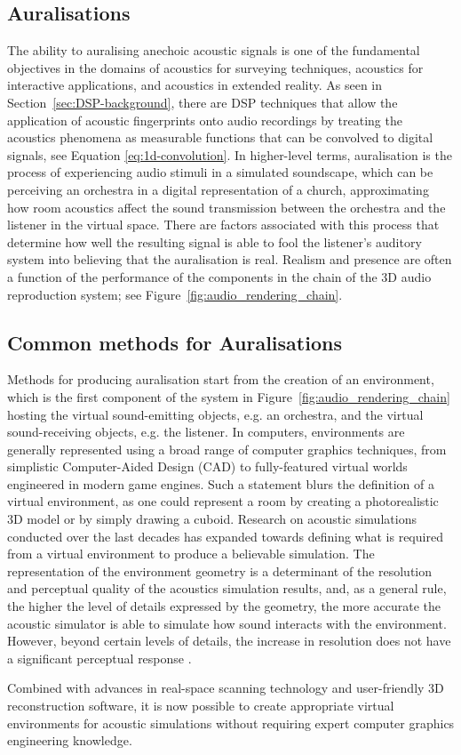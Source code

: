 \subsection{Auralisations}
The ability to auralising anechoic acoustic signals is one of the fundamental objectives in the domains of acoustics for surveying techniques, acoustics for interactive applications, and acoustics in extended reality. As seen in Section~\ref{sec:DSP-background}, there are DSP techniques that allow the application of acoustic fingerprints onto audio recordings by treating the acoustics phenomena as measurable functions that can be convolved to digital signals, see Equation \ref{eq:1d-convolution}. In higher-level terms, auralisation is the process of experiencing audio stimuli in a simulated soundscape, which can be perceiving an orchestra in a digital representation of a church, approximating how room acoustics affect the sound transmission between the orchestra and the listener in the virtual space. There are factors associated with this process that determine how well the resulting signal is able to fool the listener's auditory system into believing that the auralisation is real. Realism and presence are often a function of the performance of the components in the chain of the 3D audio reproduction system; see Figure~\ref{fig:audio_rendering_chain}.

\subsection{Common methods for Auralisations}
Methods for producing auralisation start from the creation of an environment, which is the first component of the system in Figure~\ref{fig:audio_rendering_chain} hosting the virtual sound-emitting objects, e.g. an orchestra, and the virtual sound-receiving objects, e.g. the listener. In computers, environments are generally represented using a broad range of computer graphics techniques, from simplistic Computer-Aided Design (CAD) to fully-featured virtual worlds engineered in modern game engines. Such a statement blurs the definition of a virtual environment, as one could represent a room by creating a photorealistic 3D model or by simply drawing a cuboid. Research on acoustic simulations conducted over the last decades has expanded towards defining what is required from a virtual environment to produce a believable simulation. The representation of the environment geometry is a determinant of the resolution and perceptual quality of the acoustics simulation results, and, as a general rule, the higher the level of details expressed by the geometry, the more accurate the acoustic simulator is able to simulate how sound interacts with the environment. However, beyond certain levels of details, the increase in resolution does not have a significant perceptual response \cite{pelzer2010frequency}.\par
Combined with advances in real-space scanning technology and user-friendly 3D reconstruction software, it is now possible to create appropriate virtual environments for acoustic simulations without requiring expert computer graphics engineering knowledge.\par

